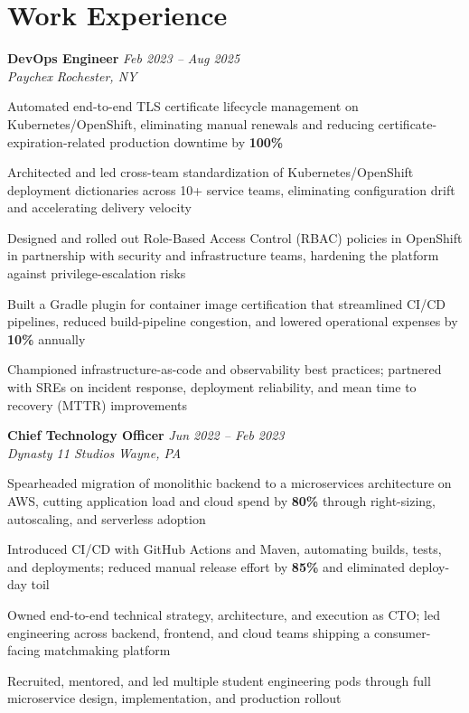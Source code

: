 \documentclass[letterpaper,10pt]{article}
\newcommand{\role}[4]{%
  \textbf{#1} \hfill \textit{#3}\\[-1pt]
  \textit{#2} \hfill \textit{#4}\par\vspace{2pt}
}
\begin{document}
\section*{Work Experience}
\role{DevOps Engineer}{Paychex}{Feb 2023 -- Aug 2025}{Rochester, NY}
\begin{tightitemize}
  \item Automated end-to-end TLS certificate lifecycle management on Kubernetes/OpenShift, eliminating manual renewals and reducing certificate-expiration-related production downtime by \textbf{100\%}
  \item Architected and led cross-team standardization of Kubernetes/OpenShift deployment dictionaries across 10+ service teams, eliminating configuration drift and accelerating delivery velocity
  \item Designed and rolled out Role-Based Access Control (RBAC) policies in OpenShift in partnership with security and infrastructure teams, hardening the platform against privilege-escalation risks
  \item Built a Gradle plugin for container image certification that streamlined CI/CD pipelines, reduced build-pipeline congestion, and lowered operational expenses by \textbf{10\%} annually
  \item Championed infrastructure-as-code and observability best practices; partnered with SREs on incident response, deployment reliability, and mean time to recovery (MTTR) improvements
\end{tightitemize}

\role{Chief Technology Officer}{Dynasty 11 Studios}{Jun 2022 -- Feb 2023}{Wayne, PA}
\begin{tightitemize}
  \item Spearheaded migration of monolithic backend to a microservices architecture on AWS, cutting application load and cloud spend by \textbf{80\%} through right-sizing, autoscaling, and serverless adoption
  \item Introduced CI/CD with GitHub Actions and Maven, automating builds, tests, and deployments; reduced manual release effort by \textbf{85\%} and eliminated deploy-day toil
  \item Owned end-to-end technical strategy, architecture, and execution as CTO; led engineering across backend, frontend, and cloud teams shipping a consumer-facing matchmaking platform
  \item Recruited, mentored, and led multiple student engineering pods through full microservice design, implementation, and production rollout
\end{tightitemize}
\end{document}
